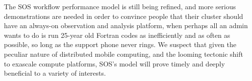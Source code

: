     The SOS workflow performance model is still being refined, and
more serious demonstrations are needed in order to convince people
that their cluster should have an always-on observation and analysis
platform, when perhaps all an admin wants to do is run 25-year old
Fortran codes as inefficiently and as often as possible, so long as
the support phone never rings. We suspect that given the peculiar
nature of distributed mobile computing, and the looming tectonic shift
to exascale compute platforms, SOS's model will prove timely and
deeply beneficial to a variety of interests.

